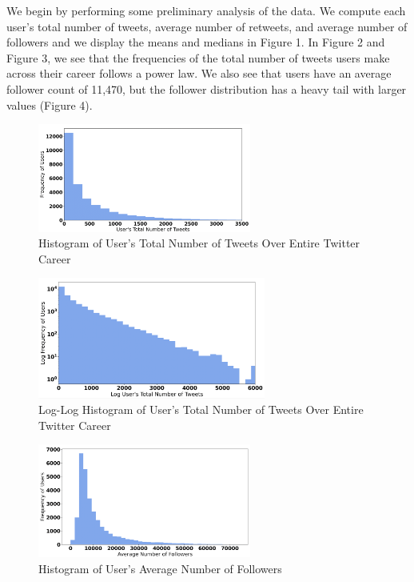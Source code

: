 \documentclass[twoside,twocolumn]{article}
\begin{document}
We begin by performing some preliminary analysis of the data. We compute each user’s total number of tweets, average number of retweets, and average number of followers and we display the means and medians in Figure 1. In Figure 2 and Figure 3, we see that the frequencies of the total number of tweets users make across their career follows a power law. We also see that users have an average follower count of 11,470, but the follower distribution has a heavy tail with larger values (Figure 4). \\



\begin{figure}[h]
\includegraphics[width=7cm]{p1.png}
\caption{Histogram of User's Total Number of Tweets Over Entire Twitter Career}
\end{figure}

\begin{figure}[h]
\includegraphics[width=7.5cm]{p2.png}
\caption{Log-Log Histogram of User's Total Number of Tweets Over Entire Twitter Career}
\end{figure}

\begin{figure}[h]
\includegraphics[width=7cm]{p3.png}
\caption{Histogram of User's Average Number of Followers}
\end{figure}
\end{document}
